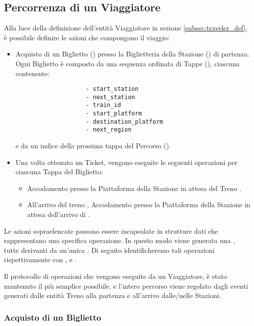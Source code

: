 \subsection{Percorrenza di un Viaggiatore}\label{subsec:percorrenza_viaggiatore}
	
	Alla luce della definizione dell'entità Viaggiatore in sezione \ref{subsec:traveler_def}, è possibile definire le azioni che compongono il viaggio:
		\begin{itemize}
			\item Acquisto di un Biglietto () presso la Biglietteria della Stazione () di partenza. Ogni Biglietto è composto da una sequenza ordinata di Tappe (), ciascuna contenente:
				\begin{verbatim}
					- start_station
					- next_station
					- train_id 
					- start_platform 
					- destination_platform
					- next_region
				\end{verbatim}
			e da un indice della prossima tappa del Percorso ().
			
			\item Una volta ottenuto un Ticket, vengono eseguite le seguenti operazioni per ciascuna Tappa del Biglietto:
				\begin{itemize}
					\item Accodamento presso la Piattaforma  della Stazione  in attesa del Treno .
					\item All'arrivo del treno , Accodamento presso la Piattaforma  della Stazione  in attesa dell'arrivo di . 
				\end{itemize}
		\end{itemize} 
	Le azioni sopraelencate possono essere incapsulate in strutture dati che rappresentano una specifica operazione. In questo modo viene generata una , tutte derivanti da un'unica . Di seguito identificheremo tali operazioni rispettivamente con ,  e .
	
	Il protocollo di operazioni che vengono eseguite da un Viaggiatore, è stato mantenuto il più semplice possibile, e l'intero percorso viene regolato dagli eventi generati dalle entità Treno alla partenza e all'arrivo dalle/nelle Stazioni. 
	
	\subsubsection{Acquisto di un Biglietto}
	
